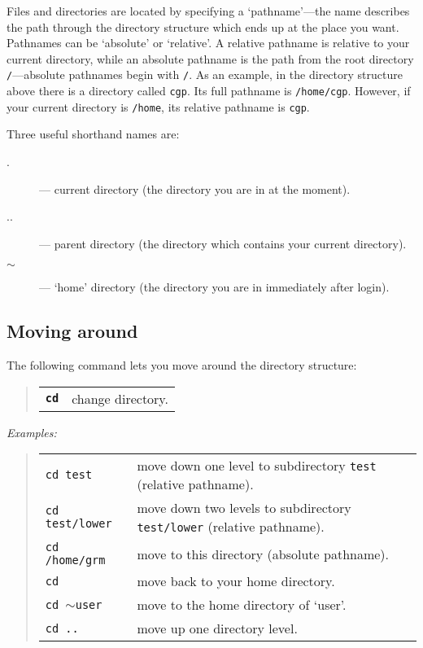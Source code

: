 Files and directories are located by specifying a `pathname'---the name
describes the path through the directory structure which ends up at the
place you want.
Pathnames can be `absolute' or `relative'.
A relative pathname is relative to your current directory, while an absolute
pathname is the path from the root directory {\tt /}---absolute pathnames
begin with {\tt /}.
As an example, in the directory structure above there is a directory called
{\tt cgp}.
Its full pathname is {\tt /home/cgp}.
However, if your current directory is {\tt /home}, its relative pathname is
{\tt cgp}.

Three useful shorthand names are:
\begin{description}
\begin{description}
\item [.] --- current directory (the directory you are in at the moment).
\item [..] --- parent directory (the directory which contains your current
 directory).
\item [$\sim$] --- `home' directory (the directory you are in immediately
 after login).
\end{description}
\end{description}

\subsection{Moving around}

The following command lets you move around the directory structure:

\begin{quote}
\begin{tabular}{lp{5.2in}}

{\tt\bf cd}  & change directory.

\end{tabular}
\end{quote}

{\em Examples:}

\begin{quote}
\begin{tabular}{lp{4.5in}}

{\tt cd test}          & move down one level to subdirectory {\tt test}
                         (relative pathname).\\

{\tt cd test/lower}    & move down two levels to subdirectory {\tt test/lower}
                         (relative pathname).\\

{\tt cd /home/grm}     & move to this directory (absolute pathname).\\

{\tt cd}               & move back to your home directory.\\

{\tt cd $\sim$user}    & move to the home directory of `user'.\\

{\tt cd ..}            & move up one directory level.

\end{tabular}
\end{quote}

